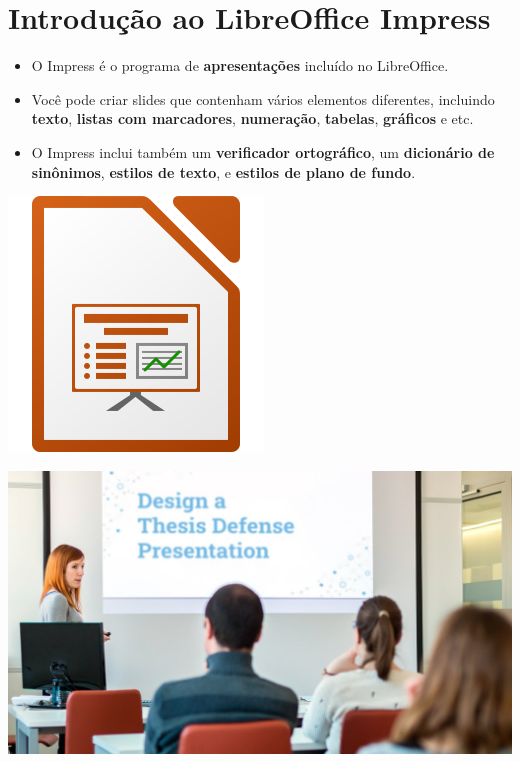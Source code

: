 \section{Introdução ao LibreOffice Impress}

\begin{frame}{}
	\begin{block}{}
		\begin{itemize}
			\item O Impress é o programa de \textbf{apresentações} incluído no LibreOffice.
			\item Você pode criar slides que contenham vários elementos diferentes, incluindo \textbf{texto}, \textbf{listas com marcadores}, \textbf{numeração}, \textbf{tabelas}, \textbf{gráficos} e etc.
			\item O Impress inclui também um \textbf{verificador ortográfico}, um \textbf{dicionário de sinônimos}, \textbf{estilos de texto}, e \textbf{estilos de plano de fundo}.
		\end{itemize}
	\end{block}

	\medskip

	\centering
	\includegraphics[width=0.3\linewidth]{Figuras/Ch05/fig1}
\end{frame}


\begin{frame}{}
	
	\centering
	\includegraphics[width=1\linewidth]{Figuras/Ch05/fig0.1}
\end{frame}


